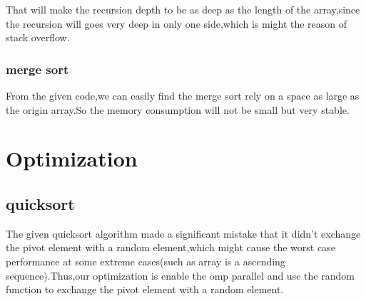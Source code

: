 \documentclass[11pt]{scrartcl} %
\begin{document}
	That will make the recursion depth to be as deep as the length of the array,since the recursion will goes very deep in only one side,which is might the reason of stack overflow.
	\subsubsection{merge sort}
	From the given code,we can easily find the merge sort rely on a space as large as the origin array.So the memory consumption will not be small but very stable.
\section{Optimization}
	\subsection{quicksort}
	The given quicksort algorithm made a significant mistake that it didn't exchange the pivot element with a random element,which might cause the worst case performance at some extreme cases(such as array is a ascending sequence).Thus,our optimization is enable the omp parallel and use the random function to exchange the pivot element with a random element.
\end{document}
